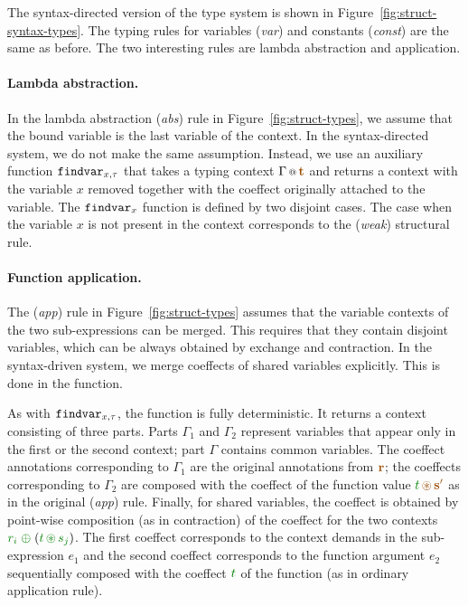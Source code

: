 The syntax-directed version of the type system is shown in Figure~\ref{fig:struct-syntax-types}.
The typing rules for variables (\emph{var}) and constants (\emph{const}) are the same as before.
The two interesting rules are lambda abstraction and application.

\paragraph{Lambda abstraction.}
In the lambda abstraction (\emph{abs}) rule in Figure~\ref{fig:struct-types}, we assume that the bound
variable is the last variable of the context. In the syntax-directed system, we do not make the
same assumption. Instead, we use an auxiliary function $\textnormal{\ttfamily findvar}_{x,\tau}$ that takes a typing
context $\coctx{\Gamma}{\aclrd{\textbf{t}}}$ and returns a context with the variable $x$ removed
together with the coeffect originally attached to the variable. The $\textnormal{\ttfamily findvar}_x$ function is
defined by two disjoint cases. The case when the variable $x$ is not present in the context
corresponds to the (\emph{weak}) structural rule.

\paragraph{Function application.} The (\emph{app}) rule in Figure~\ref{fig:struct-types}
assumes that the variable contexts of the two sub-expressions can be merged. This requires that they
contain disjoint variables, which can be always obtained by exchange and contraction. In the
syntax-driven system, we merge coeffects of shared variables explicitly. This is done in the
 function.

As with $\textnormal{\ttfamily findvar}_{x,\tau}$, the  function is fully deterministic.
It returns a context consisting of three parts. Parts $\Gamma_1$
and $\Gamma_2$ represent variables that appear only in the first or the second context; part
$\Gamma$ contains common variables. The coeffect annotations corresponding to $\Gamma_1$ are
the original annotations from $\aclrd{\textbf{r}}$; the coeffects corresponding to $\Gamma_2$
are composed with the coeffect of the function value $\cclrd{t} \,\aseq\, \aclrd{\textbf{s}'}$
as in the original (\emph{app}) rule. Finally, for shared variables, the coeffect is
obtained by point-wise composition (as in contraction) of the coeffect for the two contexts
$\cclrd{r_i} \;\cpar\; (\cclrd{t} \,\cseq\, \cclrd{s_j})$. The first coeffect corresponds to the
context demands in the sub-expression $e_1$ and the second coeffect corresponds to the
function argument $e_2$ sequentially composed with the coeffect $\cclrd{t}$ of the function
(as in ordinary application rule).


